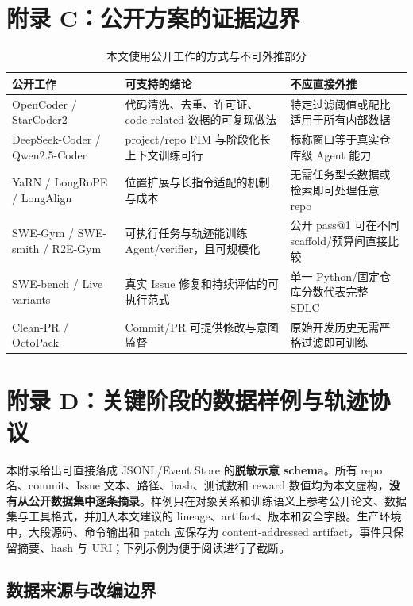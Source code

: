 \documentclass[10pt,a4paper,UTF8,fontset=none]{ctexart}
\begin{document}
\section{附录 C：公开方案的证据边界}

\begin{table}[htbp]
\centering
\caption{本文使用公开工作的方式与不可外推部分}
\label{zh:tab:evidence-boundary}
\small
\begin{tabularx}{\textwidth}{p{3.0cm}YY}
\toprule
公开工作 & 可支持的结论 & 不应直接外推 \\
\midrule
OpenCoder / StarCoder2 & 代码清洗、去重、许可证、code-related 数据的可复现做法 & 特定过滤阈值或配比适用于所有内部数据 \\
DeepSeek-Coder / Qwen2.5-Coder & project/repo FIM 与阶段化长上下文训练可行 & 标称窗口等于真实仓库级 Agent 能力 \\
YaRN / LongRoPE / LongAlign & 位置扩展与长指令适配的机制与成本 & 无需任务型长数据或检索即可处理任意 repo \\
SWE-Gym / SWE-smith / R2E-Gym & 可执行任务与轨迹能训练 Agent/verifier，且可规模化 & 公开 pass@1 可在不同 scaffold/预算间直接比较 \\
SWE-bench / Live variants & 真实 Issue 修复和持续评估的可执行范式 & 单一 Python/固定仓库分数代表完整 SDLC \\
Clean-PR / OctoPack & Commit/PR 可提供修改与意图监督 & 原始开发历史无需严格过滤即可训练 \\
\bottomrule
\end{tabularx}
\end{table}

\section{附录 D：关键阶段的数据样例与轨迹协议}

本附录给出可直接落成 JSONL/Event Store 的\textbf{脱敏示意 schema}。所有 repo 名、commit、Issue 文本、路径、hash、测试数和 reward 数值均为本文虚构，\textbf{没有从公开数据集中逐条摘录}。样例只在对象关系和训练语义上参考公开论文、数据集与工具格式，并加入本文建议的 lineage、artifact、版本和安全字段。生产环境中，大段源码、命令输出和 patch 应保存为 content-addressed artifact，事件只保留摘要、hash 与 URI；下列示例为便于阅读进行了截断。

\subsection{数据来源与改编边界}
\end{document}
